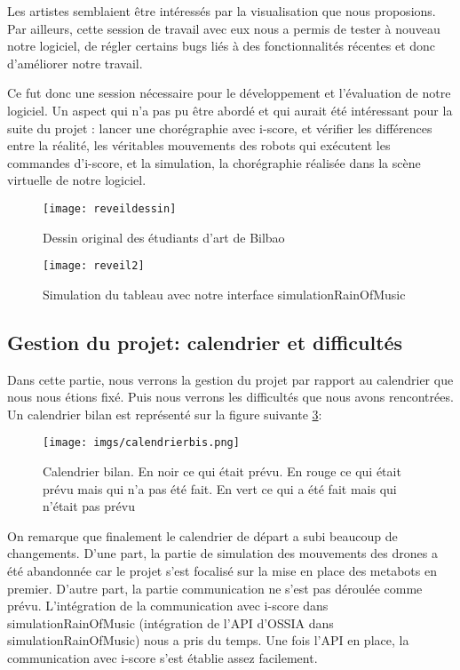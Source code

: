 Les artistes semblaient être intéressés par la visualisation que nous proposions. Par ailleurs, cette session de travail avec eux nous a permis de tester à nouveau notre logiciel, de régler certains bugs liés à des fonctionnalités récentes et donc d'améliorer notre travail. 

Ce fut donc une session nécessaire pour le développement et l'évaluation de notre logiciel. Un aspect qui n'a pas pu être abordé et qui aurait été intéressant pour la suite du projet : lancer une chorégraphie avec i-score, et vérifier les différences entre la réalité, les véritables mouvements des robots qui exécutent les commandes d'i-score, et la simulation, la chorégraphie réalisée dans la scène virtuelle de notre logiciel.

\begin{figure}[H]
\centering
\texttt{[image: reveildessin]}
\caption{Dessin original des étudiants d'art de Bilbao}
\label{chore}
\end{figure}


\begin{figure} [H]
\centering
\texttt{[image: reveil2]}
\caption{Simulation du tableau avec notre interface simulationRainOfMusic}
\label{reveil}
\end{figure}


\subsection{Gestion du projet: calendrier et difficultés}

Dans cette partie, nous verrons la gestion du projet par rapport au calendrier que nous nous étions fixé. Puis nous verrons les difficultés que nous avons rencontrées. Un calendrier bilan est représenté sur la figure suivante \ref{cal}:

\begin{figure}[H]
  \begin{center}
  	\texttt{[image: imgs/calendrierbis.png]}
  	\caption{Calendrier bilan. En noir ce qui était prévu. En rouge ce qui était prévu mais qui n'a pas été fait. En vert ce qui a été fait mais qui n'était pas prévu}
  	\label{cal}
  \end{center}
\end{figure}

On remarque que finalement le calendrier de départ a subi beaucoup de changements. D'une part, la partie de simulation des mouvements des drones a été abandonnée car le projet s'est focalisé sur la mise en place des metabots en premier. D'autre part, la partie communication ne s'est pas déroulée comme prévu. L'intégration de la communication avec i-score dans simulationRainOfMusic (intégration de l'API d'OSSIA dans simulationRainOfMusic) nous a pris du temps. Une fois l'API en place, la communication avec i-score s'est établie assez facilement. 


